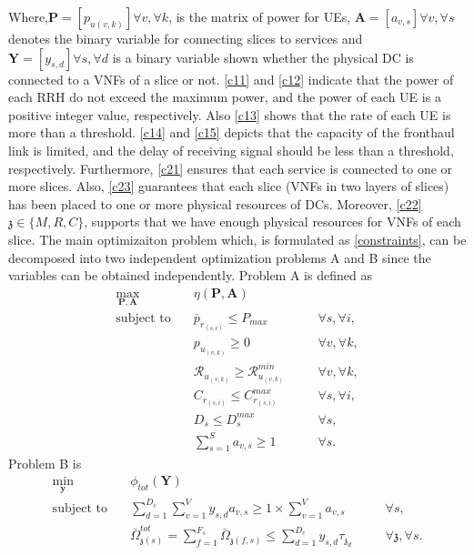 \documentclass[conference]{IEEEtran}
\begin{document}
Where,$\boldsymbol{P} =[p_{u(v,k)}]  \forall v , \forall k $, is the matrix of power for UEs, $\boldsymbol{A} =[a_{v,s}]  \forall v , \forall s $ denotes the binary variable for connecting slices to services and $\boldsymbol{Y} =[y_{s,d}]   \forall s ,  \forall d $ is a binary variable shown whether 
the physical DC is connected to a VNFs of a slice or not. 
\eqref{c11} and \eqref{c12} indicate that the power of each RRH do not exceed the maximum power, and the power of each UE is a positive integer value, respectively. Also \eqref{c13} shows that the rate of each UE is more than a threshold. \eqref{c14} and \eqref{c15} depicts that the capacity of the fronthaul link is limited, and the delay of receiving signal should be less than a threshold, respectively.  
Furthermore, \eqref{c21}
ensures that each service is connected to one or more slices.
Also, \eqref{c23} guarantees that each slice (VNFs in two layers of slices) has been placed to one or more physical resources of DCs. Moreover, \eqref{c22}  $\mathfrak{z}\in \{M,R,C\}$, supports 
that we have enough physical resources for VNFs of each slice.\newline 
The main optimizaiton problem which, is formulated as \eqref{constraints}, can be decomposed into two independent optimization problems A and B since the variables can be obtained independently. Problem A is defined as 
\begin{subequations}
\begin{alignat}{4}
\max\limits_{\boldsymbol{P}, \boldsymbol{A} }   \quad &   \eta(\boldsymbol{P},\boldsymbol{A})\\
\text{subject to} \quad  & \bar{p}_{r_{(s,i)}} \leq P_{max} && \quad \forall s, \forall i,   \\
&p_{u_{(v,k)}}  \geq 0  &&\quad \forall v, \forall k, \\
&\mathcal{R}_{u_{(v,k)}} \geq  \mathcal{R}_{u_{(v,k)}}^{min} && \quad \forall v, \forall k, \\                                 
&C_{r_{(s,i)}} \leq C_{r_{(s,i)}}^{max}  &&\quad \forall s, \forall i,\label{cc14} \\
&D_{s} \leq D_{s}^{max}  &&\quad \forall s, \label{cc15} \\
& \sum_{s=1}^{S}a_{v,s} \geq 1 &&\quad \forall s.
\end{alignat} 
\label{constraints1}
\end{subequations}
Problem B is 
\begin{subequations}
\begin{alignat}{4}
\min\limits_{\boldsymbol{y} }   \quad &   \phi_{tot}(\boldsymbol{Y})\\
\text{subject to} \quad & \sum_{d=1}^{D_c}\sum_{v=1}^{V}y_{s,d}a_{v,s} \geq 1\times\sum_{v=1}^{V}a_{v,s} &&\quad \forall s, \\
&  \bar{\Omega}_{\mathfrak{z}(s)}^{tot} = \sum_{f=1}^{F_s}\bar{\Omega}_{\mathfrak{z}(f,s)} \leq  \sum_{d=1}^{D_c} y_{s,d} \tau_{\mathfrak{z}_d}                      
 && \quad \forall \mathfrak{z}, \forall s. \label{eqomega}
\end{alignat}
\label{constraints2}
\end{subequations}
\end{document}
